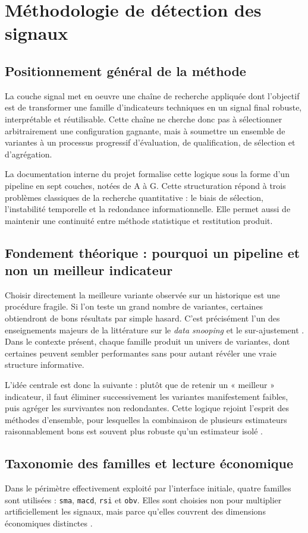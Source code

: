 \chapter{Méthodologie de détection des signaux}

\section{Positionnement général de la méthode}
La couche signal met en oeuvre une chaîne de recherche appliquée dont l'objectif
est de transformer une famille d'indicateurs techniques en un signal final
robuste, interprétable et réutilisable. Cette chaîne ne cherche donc pas à
sélectionner arbitrairement une configuration gagnante, mais à soumettre un
ensemble de variantes à un processus progressif d'évaluation, de qualification,
de sélection et d'agrégation.

La documentation interne du projet formalise cette logique sous la forme d'un
pipeline en sept couches, notées de A à G. Cette structuration répond à trois
problèmes classiques de la recherche quantitative : le biais de sélection,
l'instabilité temporelle et la redondance informationnelle. Elle permet aussi de
maintenir une continuité entre méthode statistique et restitution produit.

\section{Fondement théorique : pourquoi un pipeline et non un meilleur indicateur}
Choisir directement la meilleure variante observée sur un historique est une
procédure fragile. Si l'on teste un grand nombre de variantes, certaines
obtiendront de bons résultats par simple hasard. C'est précisément l'un des
enseignements majeurs de la littérature sur le \emph{data snooping} et le
sur-ajustement \cite{white2000,bailey2014}. Dans le contexte présent, chaque
famille produit un univers de variantes, dont certaines peuvent sembler
performantes sans pour autant révéler une vraie structure informative.

L'idée centrale est donc la suivante : plutôt que de retenir un « meilleur »
indicateur, il faut éliminer successivement les variantes manifestement faibles,
puis agréger les survivantes non redondantes. Cette logique rejoint l'esprit des
méthodes d'ensemble, pour lesquelles la combinaison de plusieurs estimateurs
raisonnablement bons est souvent plus robuste qu'un estimateur isolé
\cite{breiman1996}.

\section{Taxonomie des familles et lecture économique}
Dans le périmètre effectivement exploité par l'interface initiale, quatre
familles sont utilisées : \texttt{sma}, \texttt{macd}, \texttt{rsi} et
\texttt{obv}. Elles sont choisies non pour multiplier artificiellement les
signaux, mais parce qu'elles couvrent des dimensions économiques distinctes
\cite{murphy1999,elder1993}.

